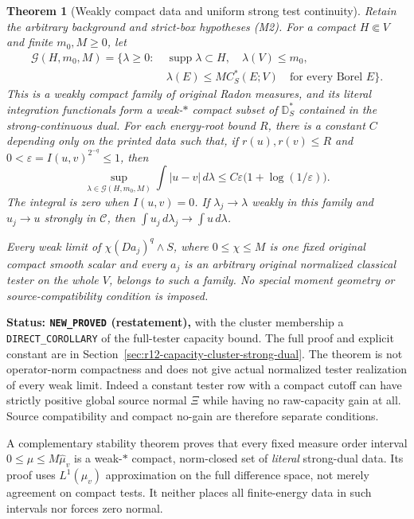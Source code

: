 \documentclass[11pt,a4paper]{article}
\numberwithin{equation}{section}
\newtheorem{theorem}{Theorem}[section]
\theoremstyle{definition}
\theoremstyle{remark}
\begin{document}
\begin{theorem}[Weakly compact data and uniform strong test continuity]
\label{thm:r12-main-full-tester-data}
Retain the arbitrary background and strict-box hypotheses (M2).
For a compact $H\Subset V$ and finite $m_0,M\geq0$, let
\[
 \begin{split}
 \mathcal G(H,m_0,M)=\{\lambda\geq0:\ &\operatorname{supp}\lambda\subset H,
 \quad\lambda(V)\leq m_0,\\
 &\lambda(E)\leq M C_S^*(E;V)\quad\text{for every Borel }E\}.
 \end{split}
 \tag{M23}
\]
This is a weakly compact family of original Radon measures, and
its literal integration functionals form a weak-$*$ compact subset
of $\mathbb D_S^*$ contained in the strong-continuous dual.
For each energy-root bound $R$, there is a constant $C$ depending
only on the printed data such that, if $r(u),r(v)\leq R$ and
$0<\varepsilon=I(u,v)^{2^{-q}}\leq1$, then
\[
 \sup_{\lambda\in\mathcal G(H,m_0,M)}
              \int|u-v|\,d\lambda
               \leq C\varepsilon\bigl(1+\log(1/\varepsilon)\bigr).
 \tag{M24}
\]
The integral is zero when $I(u,v)=0$. If $\lambda_j\to\lambda$
weakly in this family and $u_j\to u$ strongly in $\mathscr C$,
then $\int u_j\,d\lambda_j\to\int u\,d\lambda$.

Every weak limit of $\chi(Da_j)^q\wedge S$, where
$0\leq\chi\leq M$ is one fixed original compact smooth scalar
and every $a_j$ is an arbitrary original normalized classical
tester on the whole $V$, belongs to such a family. No special
moment geometry or source-compatibility condition is imposed.
\end{theorem}

\noindent\textbf{Status: \texttt{NEW\_PROVED} (restatement),}
with the cluster membership a \texttt{DIRECT\_COROLLARY} of
the full-tester capacity bound. The full proof and explicit
constant are in Section~\ref{sec:r12-capacity-cluster-strong-dual}.
The theorem is not operator-norm compactness and does not give
actual normalized tester realization of every weak limit.
Indeed a constant tester row with a compact cutoff can have
strictly positive global source normal $\Xi$ while having no
raw-capacity gain at all. Source compatibility and compact
no-gain are therefore separate conditions.

A complementary stability theorem proves that every fixed measure
order interval $0\leq\mu\leq M\widehat\mu_v$ is a weak-$*$ compact,
norm-closed set of \emph{literal} strong-dual data. Its proof
uses $L^1(\widehat\mu_v)$ approximation on the full difference
space, not merely agreement on compact tests. It neither places
all finite-energy data in such intervals nor forces zero normal.
\end{document}
